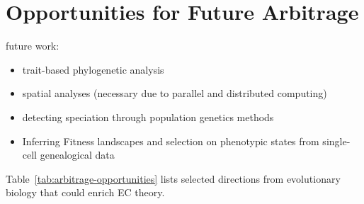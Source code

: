 \section{Opportunities for Future Arbitrage} \label{sec:opportunities}

future work:
\begin{itemize}
  \item trait-based phylogenetic analysis
  \item spatial analyses (necessary due to parallel and distributed computing)
  \item detecting speciation through population genetics methods \citep{sukumaran2021incorporating}
  \item Inferring Fitness landscapes and selection on phenotypic states from single-cell genealogical data \citep{nozoe2017inferring}
\end{itemize}

Table~\ref{tab:arbitrage-opportunities} lists selected directions from evolutionary biology that could enrich EC theory.

